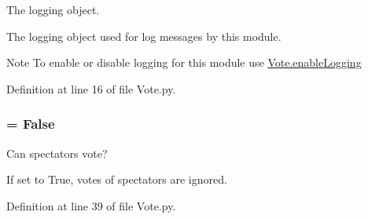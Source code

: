 The logging object. 

The logging object used for log messages by this module. \begin{DoxyNote}{Note}
To enable or disable logging for this module use \hyperlink{namespace_vote_acfb2109b9dab2995578ab19517868aa3}{Vote.enableLogging} 
\end{DoxyNote}


Definition at line 16 of file Vote.py.

\hypertarget{namespace_vote_ae0bddda424d524ab6f934decff807faa}{
\subsubsection[{spec\_\-allowed}]{ = False}}
\label{namespace_vote_ae0bddda424d524ab6f934decff807faa}


Can spectators vote? 

If set to True, votes of spectators are ignored. 

Definition at line 39 of file Vote.py.

